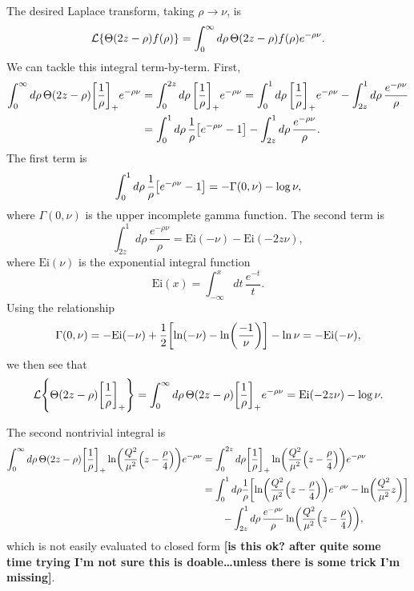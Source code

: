 \documentclass[11pt,twoside,reqno]{amsart}
\theoremstyle{plain}
\theoremstyle{remark}
\theoremstyle{definition}
\theoremstyle{remark}
\theoremstyle{definition}
\theoremstyle{definition}
\newcommand{\cL}{\mathcal{L}}
\newcommand{\Ei}{\mathrm{Ei}}
\begin{document}
	The desired Laplace transform, taking $\rho \to \nu$, is
	\begin{equation}
		\cL\qty{\Theta(2z - \rho)f(\rho)} = \int_0^\infty d\rho\, \Theta(2z - \rho) f(\rho)e^{-\rho\nu}.
	\end{equation}
	We can tackle this integral term-by-term. First,
	\begin{equation}
	\begin{aligned}
		\int_0^\infty d\rho \, \Theta(2z - \rho)\qty[\frac{1}{\rho}]_+ e^{-\rho\nu} &= \int_0^{2z} d\rho \, \qty[\frac{1}{\rho}]_+ e^{-\rho\nu} = \int_0^{1} d\rho \, \qty[\frac{1}{\rho}]_+ e^{-\rho\nu} - \int_{2z}^1 d\rho\,\frac{e^{-\rho\nu}}{\rho} \\
		&= \int_0^1 d\rho \, \frac{1}{\rho} \qty[e^{-\rho \nu} - 1] - \int_{2z}^1 d\rho \,\frac{e^{-\rho \nu}}{\rho}.
	\end{aligned}
	\end{equation}
	The first term is
	\begin{equation}
		\int_0^1 d\rho \, \frac{1}{\rho} \qty[e^{-\rho \nu} - 1] = -\Gamma(0, \nu) - \log\nu,
	\end{equation}
	where $\Gamma(0, \nu)$ is the upper incomplete gamma function. The second term is
	\begin{equation}
		\int_{2z}^1 d\rho \,\frac{e^{-\rho \nu}}{\rho} = \Ei(-\nu) - \Ei(-2z\nu),
	\end{equation}
	where $\Ei(\nu)$ is the exponential integral function
	\begin{equation}
		\Ei(x) = \int_{-\infty}^x dt\,\frac{e^{-t}}{t}.
	\end{equation}
	Using the relationship
	\begin{equation}
		\Gamma(0, \nu) = -\Ei(-\nu) + \frac{1}{2}\qty[\ln(-\nu) - \ln(\frac{-1}{\nu})] - \ln \nu = -\Ei(-\nu),
	\end{equation}
	we then see that
	\begin{equation}
		\cL\qty{\Theta(2z - \rho)\qty[\frac{1}{\rho}]_+} = \int_0^\infty d\rho \, \Theta(2z - \rho)\qty[\frac{1}{\rho}]_+ e^{-\rho\nu} = \Ei(-2z\nu) - \log\nu.
	\end{equation}

	The second nontrivial integral is
	\begin{equation}
	\begin{aligned}
		\int_0^\infty d\rho\,\Theta(2z-\rho)\qty[\frac{1}{\rho}]_+ \ln(\frac{Q^2}{\mu^2}\qty(z - \frac{\rho}{4})) e^{-\rho\nu} &= \int_0^{2z} d\rho \qty[\frac{1}{\rho}]_+ \ln(\frac{Q^2}{\mu^2}\qty(z - \frac{\rho}{4})) e^{-\rho\nu} \\
		&= \int_0^1 d\rho \frac{1}{\rho}\qty[\ln(\frac{Q^2}{\mu^2}\qty(z - \frac{\rho}{4}))e^{-\rho\nu} - \ln(\frac{Q^2}{\mu^2}z)] \\
			&\qquad - \int_{2z}^1 d\rho \, \frac{e^{-\rho \nu}}{\rho} \ln(\frac{Q^2}{\mu^2}\qty(z - \frac{\rho}{4})),
	\end{aligned}
	\end{equation}
	which is not easily evaluated to closed form {\color{red}\textbf{[is this ok? after quite some time trying I'm not sure this is doable\dots unless there is some trick I'm missing]}}.
\end{document}
